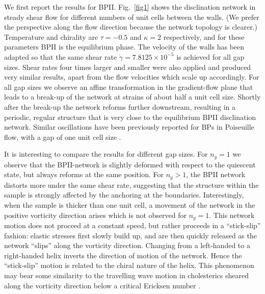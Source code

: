\documentclass[12pt,twoside]{iopart}
\newcommand{\ex}[1]{\times10^{#1}}
\begin{document}
We first report the results for BPII.
Fig.~\ref{fig1} shows the disclination network in steady shear flow for different numbers of unit cells between the walls.
(We prefer the perspective along the flow direction because the network topology is clearer.)
Temperature and chirality are $\tau=-0.5$ and $\kappa=2$ respectively, and for these parameters BPII is the equilibrium phase.
The velocity of the walls has been adapted so that the same shear rate $\dot{\gamma}=7.8125\ex{-5}$ is achieved for all gap sizes.
Shear rates four times larger and smaller were also applied and produced very similar results, apart from the flow velocities which scale up accordingly.
For all gap sizes we observe an affine transformation in the gradient-flow plane that leads to a break-up of the network at strains of about half a unit cell size.
Shortly after the break-up the network reforms further downstream, resulting in a periodic, regular structure that is very close to the equilibrium
BPII disclination network. Similar oscillations have been previously reported for
BPs in Poiseuille flow, with a gap of one unit cell size \cite{Dupuis:2005}.

It is interesting to compare the results for different gap sizes.
For $n_y=1$ we observe that the BPII-network is slightly deformed with
respect to the quiescent state, but always reforms at the same position.
For $n_y > 1$, the BPII network distorts more under the same shear rate, 
suggesting that the structure within the sample is strongly affected by
the anchoring at the boundaries.
Interestingly, when the sample is thicker than one unit cell, a movement
of the network in the positive vorticity direction arises
which is not observed for $n_y=1$.
This network motion does not proceed at a constant speed, but rather
proceeds in a ``stick-slip'' fashion: elastic stresses first slowly build up,
and are then quickly released as the network ``slips'' along the vorticity
direction. Changing from a left-handed to a right-handed helix inverts the
direction of motion of the network.
Hence the ``stick-slip'' motion is related to the chiral nature of the helix.
This phenomenon may bear some similarity to the travelling wave motion in
cholesterics sheared along the vorticity direction 
below a critical Ericksen number \cite{Rey:1996a, Rey:1996b}.
\end{document}
